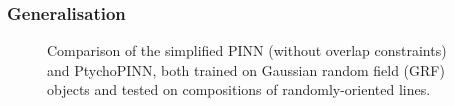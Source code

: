 \documentclass[sn-mathphys]{sn-jnl}%
\theoremstyle{thmstyleone}%
\theoremstyle{thmstyletwo}%
\theoremstyle{thmstylethree}%
\begin{document}
\subsubsection{Generalisation} \label{sec_generalization}

\begin{figure}%
    \centering
    \caption{Comparison of the simplified PINN (without overlap constraints) and PtychoPINN, both trained on Gaussian random field (GRF) objects and tested on compositions of randomly-oriented lines.}
\label{fig:gen}%
\end{figure}


\end{document}
